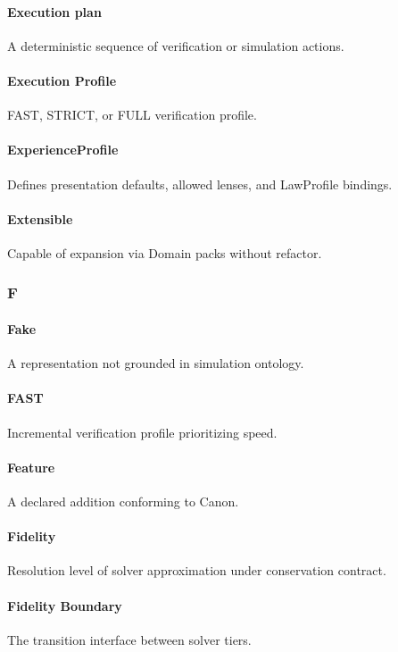 \documentclass[9pt,a4paper,openany]{book}
\begin{document}
\paragraph{Execution plan}
A deterministic sequence of verification or simulation actions.\allowbreak{}


\paragraph{Execution Profile}
FAST, STRICT, or FULL verification profile.\allowbreak{}


\paragraph{ExperienceProfile}
Defines presentation defaults, allowed lenses, and LawProfile bindings.\allowbreak{}


\paragraph{Extensible}
Capable of expansion via Domain packs without refactor.\allowbreak{}


\subsubsection{F}

\paragraph{Fake}
A representation not grounded in simulation ontology.\allowbreak{}


\paragraph{FAST}
Incremental verification profile prioritizing speed.\allowbreak{}


\paragraph{Feature}
A declared addition conforming to Canon.\allowbreak{}


\paragraph{Fidelity}
Resolution level of solver approximation under conservation contract.\allowbreak{}


\paragraph{Fidelity Boundary}
The transition interface between solver tiers.\allowbreak{}
\end{document}
